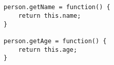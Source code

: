 \begin{verbatim}


person.getName = function() {
    return this.name;
}

person.getAge = function() {
    return this.age;
}
\end{verbatim}
